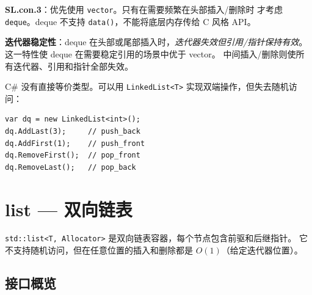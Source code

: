 \documentclass[12pt,a4paper,fontset=fandol]{ctexbook}
\newcommand{\Tp}[1]{\texttt{#1}}
\begin{document}
\begin{guideline}
\textbf{SL.con.3}：优先使用 \texttt{vector}。只有在需要频繁在头部插入/删除时
才考虑 \texttt{deque}。deque 不支持 \Tp{data()}，不能将底层内存传给 C 风格 API。
\end{guideline}

\begin{note}
\textbf{迭代器稳定性}：deque 在头部或尾部插入时，\emph{迭代器失效但引用/指针保持有效}。
这一特性使 deque 在需要稳定引用的场景中优于 vector。
中间插入/删除则使所有迭代器、引用和指针全部失效。
\end{note}

\begin{compare}
C\# 没有直接等价类型。可以用 \texttt{LinkedList<T>} 实现双端操作，但失去随机访问：
\begin{lstlisting}[style=csharpstyle]
var dq = new LinkedList<int>();
dq.AddLast(3);     // push_back
dq.AddFirst(1);    // push_front
dq.RemoveFirst();  // pop_front
dq.RemoveLast();   // pop_back
\end{lstlisting}
\end{compare}

\chapter{list --- 双向链表}

\Tp{std::list<T, Allocator>} 是双向链表容器，每个节点包含前驱和后继指针。
它不支持随机访问，但在任意位置的插入和删除都是 $O(1)$（给定迭代器位置）。

\section{接口概览}
\end{document}
